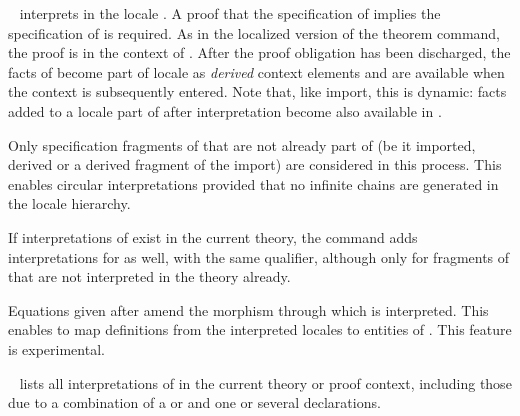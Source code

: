 \begin{isabellebody}
\begin{isamarkuptext}
\begin{description}
  \item \hyperlink{command.sublocale}{\mbox{}}~
  interprets  in the locale .  A proof that
  the specification of  implies the specification of
   is required.  As in the localized version of the
  theorem command, the proof is in the context of .  After
  the proof obligation has been discharged, the facts of 
  become part of locale  as \emph{derived} context
  elements and are available when the context  is
  subsequently entered.  Note that, like import, this is dynamic:
  facts added to a locale part of  after interpretation
  become also available in .

  Only specification fragments of  that are not already
  part of  (be it imported, derived or a derived fragment
  of the import) are considered in this process.  This enables
  circular interpretations provided that no infinite chains are
  generated in the locale hierarchy.

  If interpretations of  exist in the current theory, the
  command adds interpretations for  as well, with the same
  qualifier, although only for fragments of  that are not
  interpreted in the theory already.

  Equations given after \hyperlink{keyword.where}{\mbox{}} amend the morphism through
  which  is interpreted.  This enables to map definitions
  from the interpreted locales to entities of .  This
  feature is experimental.

  \item \hyperlink{command.print-interps}{\mbox{}}~ lists all
  interpretations of  in the current theory or proof
  context, including those due to a combination of a \hyperlink{command.interpretation}{\mbox{}} or \hyperlink{command.interpret}{\mbox{}} and one or several
  \hyperlink{command.sublocale}{\mbox{}} declarations.


\end{description}
\end{isamarkuptext}
\end{isabellebody}
